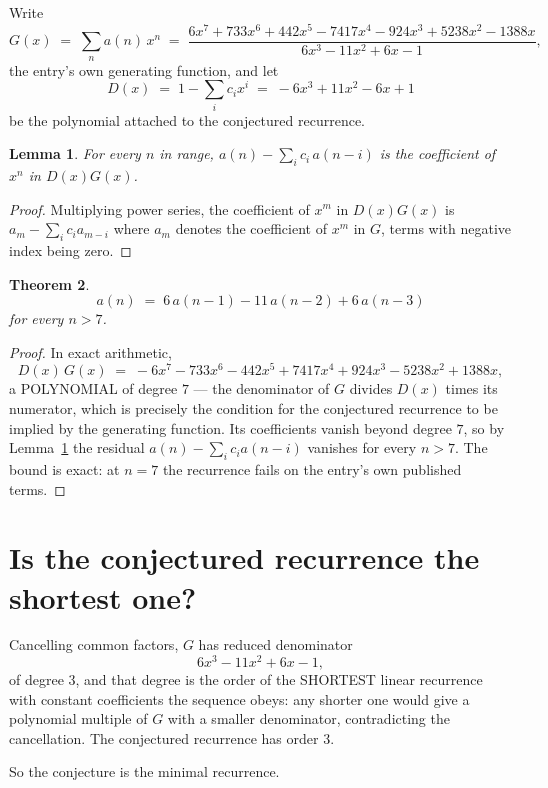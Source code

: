 \documentclass[11pt,a4paper]{article}
\theoremstyle{plain}
\newtheorem{theorem}{Theorem}
\newtheorem{lemma}[theorem]{Lemma}
\theoremstyle{definition}
\begin{document}
Write
\[
G(x)\;=\;\sum_{n}a(n)\,x^{n}\;=\;\frac{6 x^{7} + 733 x^{6} + 442 x^{5} - 7417 x^{4} - 924 x^{3} + 5238 x^{2} - 1388 x}{6 x^{3} - 11 x^{2} + 6 x - 1},
\]
the entry's own generating function, and let
\[
D(x)\;=\;1-\sum_i c_i x^{i}\;=\;- 6 x^{3} + 11 x^{2} - 6 x + 1
\]
be the polynomial attached to the conjectured recurrence.

\begin{lemma}\label{lem:key}
For every $n$ in range, $a(n)-\sum_i c_i\,a(n-i)$ is the coefficient of $x^{n}$ in
$D(x)G(x)$.
\end{lemma}

\begin{proof}
Multiplying power series, the coefficient of $x^{m}$ in $D(x)G(x)$ is
$a_m-\sum_i c_i a_{m-i}$ where $a_m$ denotes the coefficient of $x^{m}$ in $G$, terms with
negative index being zero.
\end{proof}

\begin{theorem}
\[
a(n)\;=\;6\,a(n-1) - 11\,a(n-2) + 6\,a(n-3)
\]
for every $n>7$.
\end{theorem}

\begin{proof}
In exact arithmetic,
\[
D(x)\,G(x)\;=\;- 6 x^{7} - 733 x^{6} - 442 x^{5} + 7417 x^{4} + 924 x^{3} - 5238 x^{2} + 1388 x,
\]
a POLYNOMIAL of degree $7$ --- the denominator of $G$ divides $D(x)$ times its numerator,
which is precisely the condition for the conjectured recurrence to be implied by the
generating function. Its coefficients vanish beyond degree $7$, so by
Lemma~\ref{lem:key} the residual $a(n)-\sum_ic_ia(n-i)$ vanishes for every
$n>7$. The bound is exact: at $n=7$ the recurrence fails on the entry's own published terms.
\end{proof}

\section{Is the conjectured recurrence the shortest one?}

Cancelling common factors, $G$ has reduced denominator
\[
6 x^{3} - 11 x^{2} + 6 x - 1,
\]
of degree $3$, and that degree is the order of the SHORTEST linear recurrence with
constant coefficients the sequence obeys: any shorter one would give a polynomial multiple of
$G$ with a smaller denominator, contradicting the cancellation. The conjectured recurrence has
order $3$.

So the conjecture is the minimal recurrence.
\end{document}
